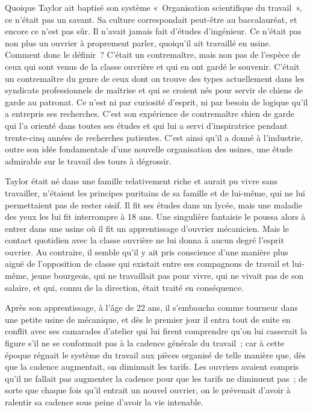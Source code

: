 \documentclass[french,twoside]{book} %
\begin{document}
Quoique Taylor ait baptisé son système « Organisation scientifique du travail », ce n'était pas un savant. Sa culture correspondait peut-être au baccalauréat, et encore ce n'est pas sûr. Il n'avait jamais fait d'études d'ingénieur. Ce n'était pas non plus un ouvrier à proprement parler, quoiqu'il ait travaillé en usine. Comment donc le définir ? C'était un contremaître, mais non pas de l'espèce de ceux qui sont venus de la classe ouvrière et qui en ont gardé le souvenir. C'était un contremaître du genre de ceux dont on trouve des types actuellement dans les syndicats professionnels de maîtrise et qui se croient nés pour servir de chiens de garde au patronat. Ce n'est ni par curiosité d'esprit, ni par besoin de logique qu'il a entrepris ses recherches. C'est son expérience de contremaître chien de garde qui l'a orienté dans toutes ses études et qui lui a servi d'inspiratrice pendant trente-cinq années de recherches patientes. C'est ainsi qu'il a donné à l'industrie, outre son idée fondamentale d'une nouvelle organisation des usines, une étude admirable sur le travail des tours à dégrossir.\par
Taylor était né dans une famille relativement riche et aurait pu vivre sans travailler, n’étaient les principes puritains de sa famille et de lui-même, qui ne lui permettaient pas de rester oisif. Il fit ses études dans un lycée, mais une maladie des yeux les lui fit interrompre à 18 ans. Une singulière fantaisie le poussa alors à entrer dans une usine où il fit un apprentissage d'ouvrier mécanicien. Mais le contact quotidien avec la classe ouvrière ne lui donna à aucun degré l'esprit ouvrier. Au contraire, il semble qu'il y ait pris conscience d'une manière plus aiguë de l'opposition de classe qui existait entre ses compagnons de travail et lui-même, jeune bourgeois, qui ne travaillait pas pour vivre, qui ne vivait pas de son salaire, et qui, connu de la direction, était traité en conséquence.\par
Après son apprentissage, à l'âge de 22 ans, il s'embaucha comme tourneur dans une petite usine de mécanique, et dès le premier jour il entra tout de suite en conflit avec ses camarades d'atelier qui lui firent comprendre qu'on lui casserait la figure s'il ne se conformait pas à la cadence générale du travail ; car à cette époque régnait le système du travail aux pièces organisé de telle manière que, dès que la cadence augmentait, on diminuait les tarifs. Les ouvriers avaient compris qu'il ne fallait pas augmenter la cadence pour que les tarifs ne diminuent pas ; de sorte que chaque fois qu'il entrait un nouvel ouvrier, on le prévenait d'avoir à ralentir sa cadence sous peine d'avoir la vie intenable.\par
\end{document}
